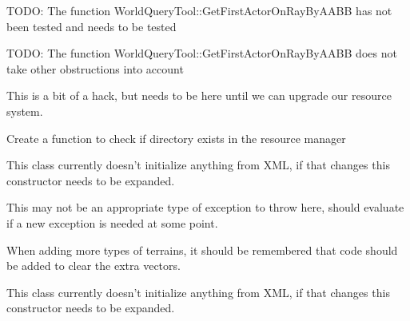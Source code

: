 \begin{DoxyRefList}
T\-O\-D\-O\-: The function World\-Query\-Tool\-::\-Get\-First\-Actor\-On\-Ray\-By\-A\-A\-B\-B has not been tested and needs to be tested 

T\-O\-D\-O\-: The function World\-Query\-Tool\-::\-Get\-First\-Actor\-On\-Ray\-By\-A\-A\-B\-B does not take other obstructions into account  
\item[\label{todo__todo000059}%
\hypertarget{todo__todo000059}{}%
Member \hyperlink{classMezzanine_1_1ResourceManager_aee575de144fe2ac87df4e06f54cb3b92}{Mezzanine\-:\-:Resource\-Manager\-:\-:Destroy\-Asset\-Group} (const String \&Group\-Name)]This is a bit of a hack, but needs to be here until we can upgrade our resource system.  
\item[\label{todo__todo000062}%
\hypertarget{todo__todo000062}{}%
Member \hyperlink{classMezzanine_1_1ResourceManager_a17b72af560fcf890ee2571dab2109a6d}{Mezzanine\-:\-:Resource\-Manager\-:\-:Resolve\-Data\-Path\-From\-String} (const String \&Path\-Var)]Create a function to check if directory exists in the resource manager  
\item[\label{todo__todo000058}%
\hypertarget{todo__todo000058}{}%
Member \hyperlink{classMezzanine_1_1ResourceManager_a23c46c4660e85d0e38f8e61ed12fde3c}{Mezzanine\-:\-:Resource\-Manager\-:\-:Resource\-Manager} (X\-M\-L\-::\-Node \&X\-M\-L\-Node)]This class currently doesn't initialize anything from X\-M\-L, if that changes this constructor needs to be expanded.  
\item[\label{todo__todo000065}%
\hypertarget{todo__todo000065}{}%
Member \hyperlink{namespaceMezzanine_ab061665515c8e8a8b09ee54d93612da1}{Mezzanine\-:\-:Serialize\-Error} (const String \&Failed\-To, const String \&Class\-Name, bool S\-Or\-D=true)]This may not be an appropriate type of exception to throw here, should evaluate if a new exception is needed at some point.  
\item[\label{todo__todo000069}%
\hypertarget{todo__todo000069}{}%
Member \hyperlink{classMezzanine_1_1TerrainManager_ae940f33a369e54c2322de4202d236eb2}{Mezzanine\-:\-:Terrain\-Manager\-:\-:Remove\-All\-Terrains} ()]When adding more types of terrains, it should be remembered that code should be added to clear the extra vectors.  
\item[\label{todo__todo000068}%
\hypertarget{todo__todo000068}{}%
Member \hyperlink{classMezzanine_1_1TerrainManager_a48caf07a7cb678b42c3eb15b1e2b01d6}{Mezzanine\-:\-:Terrain\-Manager\-:\-:Terrain\-Manager} (X\-M\-L\-::\-Node \&X\-M\-L\-Node)]This class currently doesn't initialize anything from X\-M\-L, if that changes this constructor needs to be expanded.  

\end{DoxyRefList}
